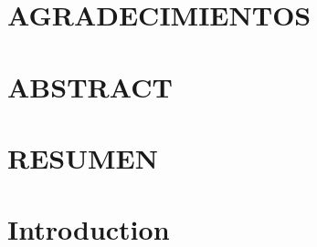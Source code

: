 \documentclass[pdftex]{pucthesis}	%
\begin{document}

 \label{acknowledgements} %
\chapter*{AGRADECIMIENTOS}           


\cleardoublepage



\tableofcontents
{} \label{listoffigures}
\listoffigures
{} \label{listoftables}
\listoftables
\cleardoublepage



 \label{abstract}
\chapter*{ABSTRACT}

\cleardoublepage

 \label{resumen}
\chapter*{RESUMEN}

\cleardoublepage




\chapter[INTRODUCTION]{Introduction}\label{chapter:intro}

\end{document}
